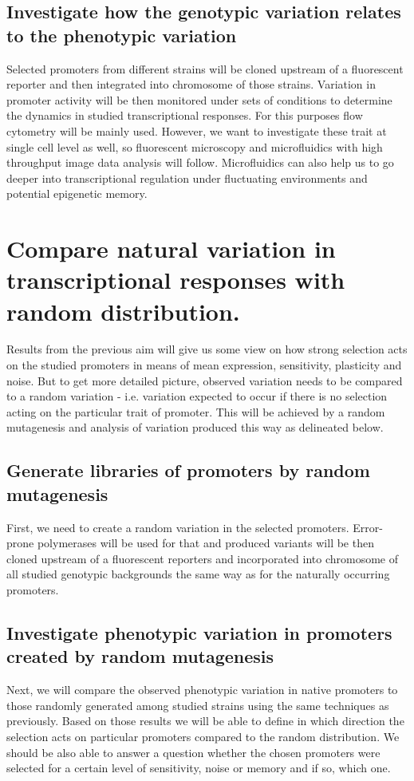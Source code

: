\subsection{Investigate how the genotypic variation relates to the phenotypic variation}
Selected promoters from different strains will be cloned upstream of a fluorescent reporter and then integrated into chromosome of those strains.
Variation in promoter activity will be then monitored under sets of conditions to determine the dynamics in studied transcriptional responses.
For this purposes flow cytometry will be mainly used.
However, we want to investigate these trait at single cell level as well, so fluorescent microscopy and microfluidics with high throughput image data analysis will follow.
Microfluidics can also help us to go deeper into transcriptional regulation under fluctuating environments and potential epigenetic memory.


\section{Compare natural variation in transcriptional responses with random distribution.}
Results from the previous aim will give us some view on how strong selection acts on the studied promoters in means of mean expression, sensitivity, plasticity and noise.
But to get more detailed picture, observed variation needs to be compared to a random variation - i.e. variation expected to occur if there is no selection acting on the particular trait of promoter.
This will be achieved by a random mutagenesis and analysis of variation produced this way as delineated below.

\subsection{Generate libraries of promoters by random mutagenesis}
First, we need to create a random variation in the selected promoters.
Error-prone polymerases will be used for that and produced variants will be then cloned upstream of a fluorescent reporters and incorporated into chromosome of all studied genotypic backgrounds the same way as for the naturally occurring promoters.

\subsection{Investigate phenotypic variation in promoters created by random mutagenesis}
Next, we will compare the observed phenotypic variation in native promoters to those randomly generated among studied strains using the same techniques as previously.
Based on those results we will be able to define in which direction the selection acts on particular promoters compared to the random distribution.
We should be also able to answer a question whether the chosen promoters were selected for a certain level of sensitivity, noise or memory and if so, which one.


\shorthandon{-} 
